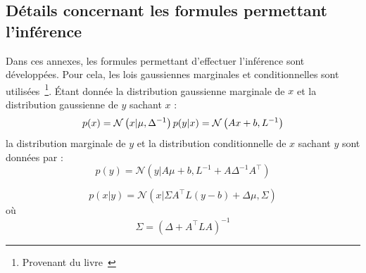 \documentclass[utf8]{frontiersSCNS} %
\begin{document}





\begin{appendices}
\section{Détails concernant les formules permettant l'inférence}
\label{sec:formulas}

Dans ces annexes, les formules permettant d'effectuer l'inférence sont développées. 
Pour cela, les lois gaussiennes marginales et conditionnelles sont utilisées~\footnote{\label{noteGaussian} Provenant du livre~\cite{bishop2006pattern}}.
Étant donnée la distribution gaussienne marginale de $x$ et la distribution gaussienne de $y$ sachant $x$ :
\begin{equation}
\label{eq:book1}
p(x) = \mathcal{N}\left(x | \mu, \Delta^{-1}\right)\\
p(y|x) = \mathcal{N}\left(Ax + b, L^{-1}\right)
\end{equation}
la distribution marginale de $y$ et la distribution conditionnelle de  $x$ sachant $y$ sont données par :
\begin{equation}
\label{eq:book2}
p(y) = \mathcal{N}\left(y | A\mu + b, L^{-1} + A\Delta^{-1}A^\top\right) 
\end{equation}

\begin{equation}
\label{eq:book3}
p(x | y) = \mathcal{N}\left(x | \Sigma{ A^\top L(y-b) + \Delta\mu},\Sigma\right)
\end{equation}
où
$$\Sigma = (\Delta + A^\top LA)^{-1}$$


\end{appendices}
\end{document}
